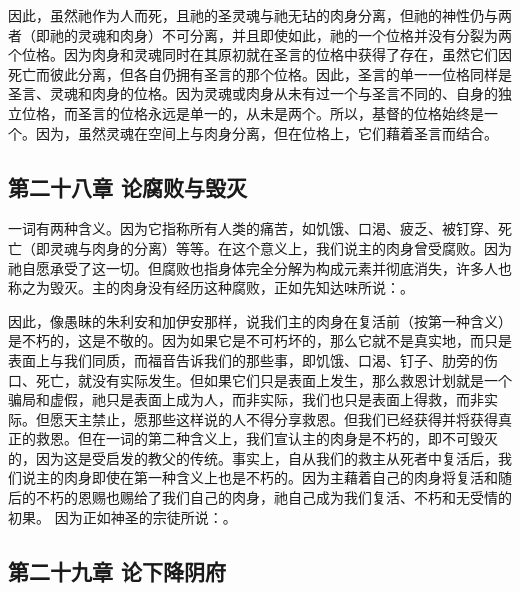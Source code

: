 因此，虽然祂作为人而死，且祂的圣灵魂与祂无玷的肉身分离，但祂的神性仍与两者（即祂的灵魂和肉身）不可分离，并且即使如此，祂的一个位格并没有分裂为两个位格。因为肉身和灵魂同时在其原初就在圣言的位格中获得了存在，虽然它们因死亡而彼此分离，但各自仍拥有圣言的那个位格。因此，圣言的单一一位格同样是圣言、灵魂和肉身的位格。因为灵魂或肉身从未有过一个与圣言不同的、自身的独立位格，而圣言的位格永远是单一的，从未是两个。所以，基督的位格始终是一个。因为，虽然灵魂在空间上与肉身分离，但在位格上，它们藉着圣言而结合。\par


\subsection{第二十八章 论腐败与毁灭}

一词有两种含义。因为它指称所有人类的痛苦，如饥饿、口渴、疲乏、被钉穿、死亡（即灵魂与肉身的分离）等等。在这个意义上，我们说主的肉身曾受腐败。因为祂自愿承受了这一切。但腐败也指身体完全分解为构成元素并彻底消失，许多人也称之为毁灭。主的肉身没有经历这种腐败，正如先知达味所说：。\par

因此，像愚昧的朱利安和加伊安那样，说我们主的肉身在复活前（按第一种含义）是不朽的，这是不敬的。因为如果它是不可朽坏的，那么它就不是真实地，而只是表面上与我们同质，而福音告诉我们的那些事，即饥饿、口渴、钉子、肋旁的伤口、死亡，就没有实际发生。但如果它们只是表面上发生，那么救恩计划就是一个骗局和虚假，祂只是表面上成为人，而非实际，我们也只是表面上得救，而非实际。但愿天主禁止，愿那些这样说的人不得分享救恩。但我们已经获得并将获得真正的救恩。但在一词的第二种含义上，我们宣认主的肉身是不朽的，即不可毁灭的，因为这是受启发的教父的传统。事实上，自从我们的救主从死者中复活后，我们说主的肉身即使在第一种含义上也是不朽的。因为主藉着自己的肉身将复活和随后的不朽的恩赐也赐给了我们自己的肉身，祂自己成为我们复活、不朽和无受情的初果。 因为正如神圣的宗徒所说：。\par


\subsection{第二十九章 论下降阴府}

